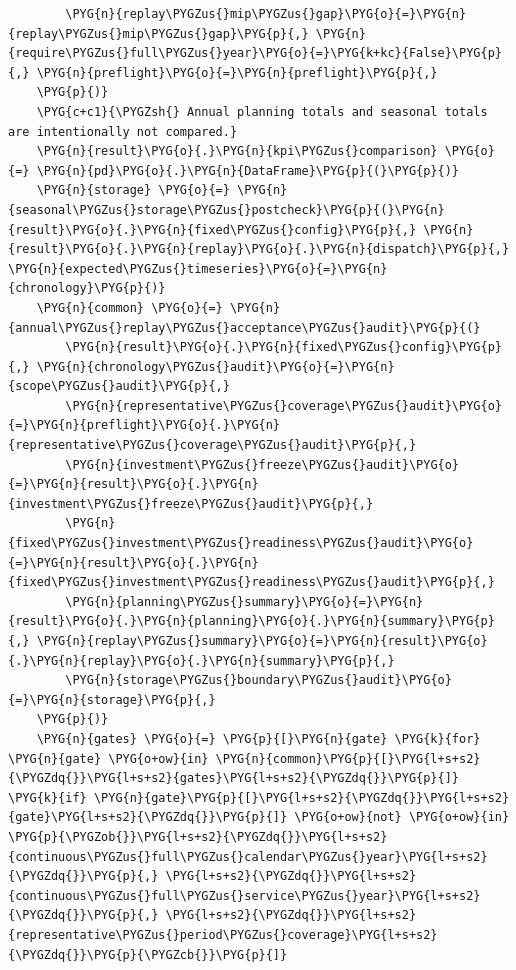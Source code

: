 \begin{Verbatim}
        \PYG{n}{replay\PYGZus{}mip\PYGZus{}gap}\PYG{o}{=}\PYG{n}{replay\PYGZus{}mip\PYGZus{}gap}\PYG{p}{,} \PYG{n}{require\PYGZus{}full\PYGZus{}year}\PYG{o}{=}\PYG{k+kc}{False}\PYG{p}{,} \PYG{n}{preflight}\PYG{o}{=}\PYG{n}{preflight}\PYG{p}{,}
    \PYG{p}{)}
    \PYG{c+c1}{\PYGZsh{} Annual planning totals and seasonal totals are intentionally not compared.}
    \PYG{n}{result}\PYG{o}{.}\PYG{n}{kpi\PYGZus{}comparison} \PYG{o}{=} \PYG{n}{pd}\PYG{o}{.}\PYG{n}{DataFrame}\PYG{p}{(}\PYG{p}{)}
    \PYG{n}{storage} \PYG{o}{=} \PYG{n}{seasonal\PYGZus{}storage\PYGZus{}postcheck}\PYG{p}{(}\PYG{n}{result}\PYG{o}{.}\PYG{n}{fixed\PYGZus{}config}\PYG{p}{,} \PYG{n}{result}\PYG{o}{.}\PYG{n}{replay}\PYG{o}{.}\PYG{n}{dispatch}\PYG{p}{,} \PYG{n}{expected\PYGZus{}timeseries}\PYG{o}{=}\PYG{n}{chronology}\PYG{p}{)}
    \PYG{n}{common} \PYG{o}{=} \PYG{n}{annual\PYGZus{}replay\PYGZus{}acceptance\PYGZus{}audit}\PYG{p}{(}
        \PYG{n}{result}\PYG{o}{.}\PYG{n}{fixed\PYGZus{}config}\PYG{p}{,} \PYG{n}{chronology\PYGZus{}audit}\PYG{o}{=}\PYG{n}{scope\PYGZus{}audit}\PYG{p}{,}
        \PYG{n}{representative\PYGZus{}coverage\PYGZus{}audit}\PYG{o}{=}\PYG{n}{preflight}\PYG{o}{.}\PYG{n}{representative\PYGZus{}coverage\PYGZus{}audit}\PYG{p}{,}
        \PYG{n}{investment\PYGZus{}freeze\PYGZus{}audit}\PYG{o}{=}\PYG{n}{result}\PYG{o}{.}\PYG{n}{investment\PYGZus{}freeze\PYGZus{}audit}\PYG{p}{,}
        \PYG{n}{fixed\PYGZus{}investment\PYGZus{}readiness\PYGZus{}audit}\PYG{o}{=}\PYG{n}{result}\PYG{o}{.}\PYG{n}{fixed\PYGZus{}investment\PYGZus{}readiness\PYGZus{}audit}\PYG{p}{,}
        \PYG{n}{planning\PYGZus{}summary}\PYG{o}{=}\PYG{n}{result}\PYG{o}{.}\PYG{n}{planning}\PYG{o}{.}\PYG{n}{summary}\PYG{p}{,} \PYG{n}{replay\PYGZus{}summary}\PYG{o}{=}\PYG{n}{result}\PYG{o}{.}\PYG{n}{replay}\PYG{o}{.}\PYG{n}{summary}\PYG{p}{,}
        \PYG{n}{storage\PYGZus{}boundary\PYGZus{}audit}\PYG{o}{=}\PYG{n}{storage}\PYG{p}{,}
    \PYG{p}{)}
    \PYG{n}{gates} \PYG{o}{=} \PYG{p}{[}\PYG{n}{gate} \PYG{k}{for} \PYG{n}{gate} \PYG{o+ow}{in} \PYG{n}{common}\PYG{p}{[}\PYG{l+s+s2}{\PYGZdq{}}\PYG{l+s+s2}{gates}\PYG{l+s+s2}{\PYGZdq{}}\PYG{p}{]} \PYG{k}{if} \PYG{n}{gate}\PYG{p}{[}\PYG{l+s+s2}{\PYGZdq{}}\PYG{l+s+s2}{gate}\PYG{l+s+s2}{\PYGZdq{}}\PYG{p}{]} \PYG{o+ow}{not} \PYG{o+ow}{in} \PYG{p}{\PYGZob{}}\PYG{l+s+s2}{\PYGZdq{}}\PYG{l+s+s2}{continuous\PYGZus{}full\PYGZus{}calendar\PYGZus{}year}\PYG{l+s+s2}{\PYGZdq{}}\PYG{p}{,} \PYG{l+s+s2}{\PYGZdq{}}\PYG{l+s+s2}{continuous\PYGZus{}full\PYGZus{}service\PYGZus{}year}\PYG{l+s+s2}{\PYGZdq{}}\PYG{p}{,} \PYG{l+s+s2}{\PYGZdq{}}\PYG{l+s+s2}{representative\PYGZus{}period\PYGZus{}coverage}\PYG{l+s+s2}{\PYGZdq{}}\PYG{p}{\PYGZcb{}}\PYG{p}{]}

\end{Verbatim}
